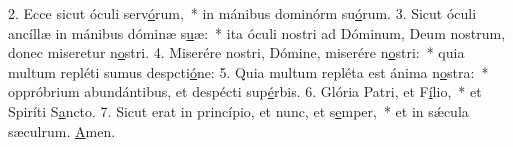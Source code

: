 2. Ecce sicut óculi serv\uline{ó}rum,~* in mánibus dominórm su\uline{ó}rum.
3. Sicut óculi ancíllæ in mánibus dóminæ s\uline{u}æ:~* ita óculi nostri ad Dóminum, Deum nostrum, donec miseretur n\uline{o}stri.
4. Miserére nostri, Dómine, miserére n\uline{o}stri:~* quia multum repléti sumus despcti\uline{ó}ne:
5. Quia multum repléta est ánima n\uline{o}stra:~* oppróbrium abundántibus, et despécti sup\uline{é}rbis.
6. Glória Patri, et F\uline{í}lio,~* et Spiríti S\uline{a}ncto.
7. Sicut erat in princípio, et nunc, et s\uline{e}mper,~* et in sǽcula sæculrum. \uline{A}men.
